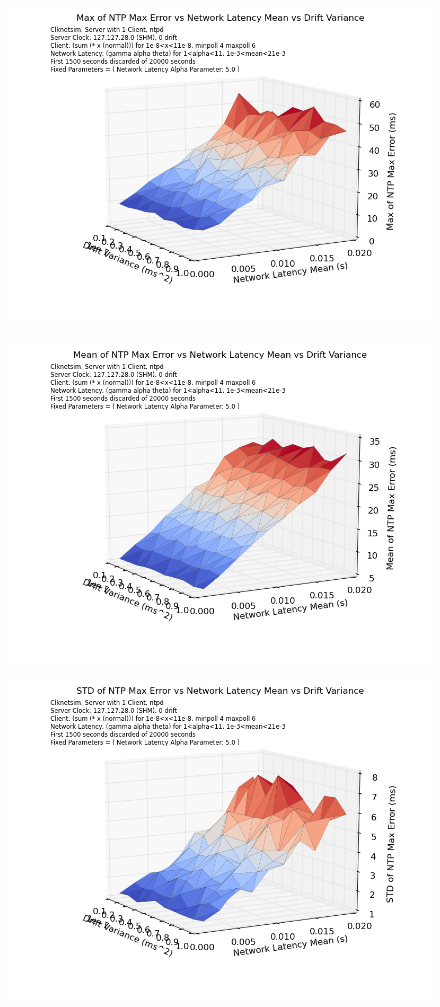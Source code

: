 \begin{figure}[t]
  \caption{}
  \label{fig:max-mean-var-drift}
  \includegraphics[width=0.8\linewidth]{max_max_err-mean_latency-drift_variance.png}
\end{figure}

\begin{figure}[h]
  \caption{}
  \label{fig:mean-mean-var-drift}
  \includegraphics[width=0.8\linewidth]{mean_max_err-mean_latency-drift_variance.png}
\end{figure}

\begin{figure}[t]
  \caption{}
  \label{fig:stddev-mean-drift-var}
  \includegraphics[width=0.8\linewidth]{stddev_max_err-mean_latency-drift_variance}
\end{figure}

